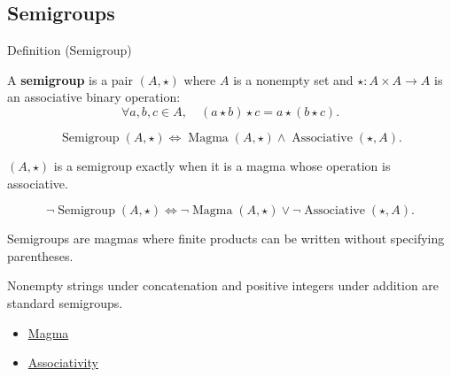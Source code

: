 \subsection*{Semigroups}
\label{subsec:semigroups}

\begin{definitionbox}{Definition (Semigroup)}
\begin{definition}[Semigroup]
\label{def:algebraic-semigroup}
A \textbf{semigroup} is a pair $(A,\star)$ where $A$ is a nonempty set and
$\star:A\times A\to A$ is an associative binary operation:
\[
\forall a,b,c \in A,\quad
(a\star b)\star c=a\star(b\star c).
\]
\end{definition}
\end{definitionbox}

\begin{remark*}
\[
\operatorname{Semigroup}(A,\star)
\Longleftrightarrow
\operatorname{Magma}(A,\star)
\land
\operatorname{Associative}(\star,A).
\]
\end{remark*}

\begin{remark*}
$(A,\star)$ is a semigroup exactly when it is a magma whose operation is
associative.
\end{remark*}

\begin{remark*}
\[
\neg\operatorname{Semigroup}(A,\star)
\Longleftrightarrow
\neg\operatorname{Magma}(A,\star)
\lor
\neg\operatorname{Associative}(\star,A).
\]
\end{remark*}

\begin{remark*}[Interpretation]
Semigroups are magmas where finite products can be written without specifying
parentheses.
\end{remark*}

\begin{remark*}[Examples]
Nonempty strings under concatenation and positive integers under addition are
standard semigroups.
\end{remark*}

\begin{dependencies}
\begin{itemize}
  \item \hyperref[def:magma]{Magma}
  \item \hyperref[def:algebraic-associativity]{Associativity}
\end{itemize}
\end{dependencies}
